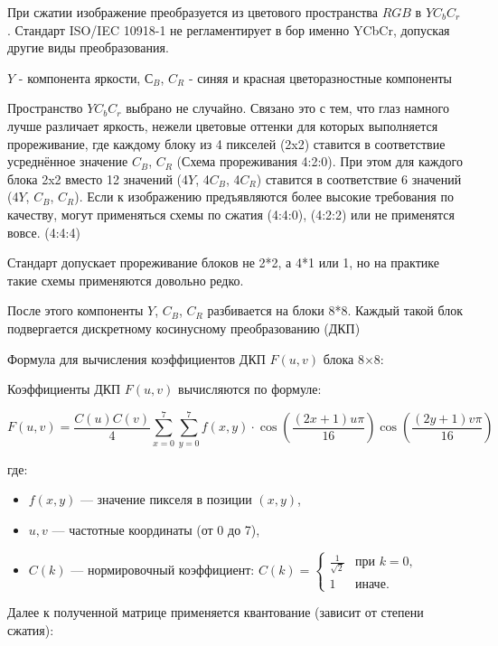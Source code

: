 \documentclass[12pt]{article}
\begin{document}
При сжатии изображение преобразуется из цветового пространства $RGB$ в $YC_{b}C_{r}$.
Стандарт ISO/IEC 10918-1 не регламентирует в    бор именно YCbCr,
допуская другие виды преобразования.

$Y$ - компонента яркости, $С_{B}$, $C_{R}$ - синяя и красная цветоразностные компоненты

Пространство $YC_{b}C_{r}$  выбрано не случайно. Связано это с тем, что глаз намного лучше различает
яркость, нежели цветовые оттенки для которых выполняется прореживание, где каждому блоку
из 4 пикселей (2x2) ставится в соответствие усреднённое значение $C_{B}$, $C_{R}$ (Схема прореживания 4:2:0).
При этом для каждого блока 2x2 вместо 12 значений (4$Y$, 4$C_{B}$, 4$C_{R}$)
ставится в соответствие 6 значений (4$Y$, $C_{B}$, $C_{R}$). Если к изображению предъявляются более высокие
требования по качеству, могут применяться схемы по сжатия (4:4:0), (4:2:2)
или не применятся вовсе. (4:4:4)

Стандарт допускает прореживание блоков не 2*2, а 4*1 или 1,
но на практике такие схемы применяются довольно редко.

После этого компоненты $Y$, $C_{B}$, $C_{R}$ разбивается на блоки 8*8.
Каждый такой блок подвергается дискретному косинусному преобразованию (ДКП)

Формула для вычисления коэффициентов ДКП $F(u,v)$ блока 8×8:

Коэффициенты ДКП $F(u,v)$ вычисляются по формуле:

\[
    F(u,v) = \frac{C(u)C(v)}{4} \sum_{x=0}^{7} \sum_{y=0}^{7} f(x,y) \cdot \cos\left(\frac{(2x+1)u\pi}{16}\right) \cos\left(\frac{(2y+1)v\pi}{16}\right)
\]

где:
\begin{itemize}
    \item $f(x,y)$ — значение пикселя в позиции $(x,y)$,
    \item $u,v$ — частотные координаты (от 0 до 7),
    \item $C(k)$ — нормировочный коэффициент:
          $
              C(k) = \begin{cases}
                  \frac{1}{\sqrt{2}} & \text{при } k=0, \\
                  1                  & \text{иначе}.
              \end{cases}
          $
\end{itemize}

Далее к полученной матрице применяется квантование (зависит от степени сжатия):
\end{document}
